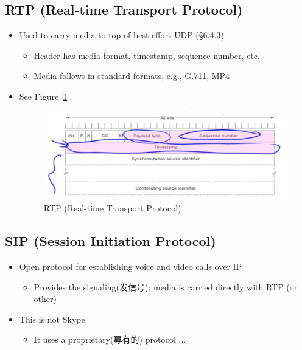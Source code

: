 \documentclass[12pt]{ctexart}   %
\begin{document}
	\subsection{RTP (Real-time Transport Protocol)}
	\begin{itemize}
		\item Used to carry media to top of best effort UDP (§6.4.3)
		\begin{itemize}
			\item Header has media format, timestamp, sequence number, etc.
			\item Media follows in standard formats, e.g., G.711, MP4
		\end{itemize}
		\item See Figure~\ref{fig:9-2-9}
		  
		 \begin{figure}[h!] %
		\centering
		 \includegraphics[scale=0.7]{images/9-2-9}
		\caption{ RTP (Real-time Transport Protocol) }
		 \label{fig:9-2-9}
		 \end{figure}
	\end{itemize}
	
	\subsection{SIP (Session Initiation Protocol)}
	\begin{itemize}
		\item Open protocol for establishing voice and video calls over IP
		\begin{itemize}
			\item Provides the signaling(发信号); media is carried directly with RTP (or other)
		\end{itemize}
		
		\item This is not Skype
		\begin{itemize}
			\item It uses a proprietary(專有的) protocol ...
		\end{itemize}
	\end{itemize}
	
\end{document}
